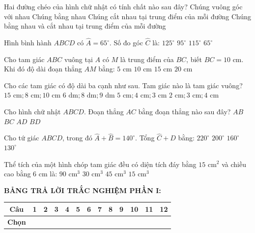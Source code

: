 \documentclass[12pt,a4paper]{article}
\begin{document}
\begin{ex}
Hai đường chéo của hình chữ nhật có tính chất nào sau đây?
\choice
{Chúng vuông góc với nhau}
{Chúng bằng nhau}
{Chúng cắt nhau tại trung điểm của mỗi đường}
{\True Chúng bằng nhau và cắt nhau tại trung điểm của mỗi đường}
\end{ex}

\begin{ex}
Hình bình hành $ABCD$ có $\widehat{A} = 65^\circ$. Số đo góc $\widehat{C}$ là:
\choice
{$125^\circ$}
{$95^\circ$}
{$115^\circ$}
{\True $65^\circ$}
\end{ex}

\begin{ex}
Cho tam giác $ABC$ vuông tại $A$ có $M$ là trung điểm của $BC$, biết $BC = 10\text{ cm}$. Khi đó độ dài đoạn thẳng $AM$ bằng:
\choice
{\True $5\text{ cm}$}
{$10\text{ cm}$}
{$15\text{ cm}$}
{$20\text{ cm}$}
\end{ex}

\begin{ex}
Cho các tam giác có độ dài ba cạnh như sau. Tam giác nào là tam giác vuông?
\choice
{$15\text{ cm}; 8\text{ cm}; 10\text{ cm}$}
{$6\text{ dm}; 8\text{ dm}; 9\text{ dm}$}
{\True $5\text{ cm}; 4\text{ cm}; 3\text{ cm}$}
{$2\text{ cm}; 3\text{ cm}; 4\text{ cm}$}
\end{ex}

\begin{ex}
Cho hình chữ nhật $ABCD$. Đoạn thẳng $AC$ bằng đoạn thẳng nào sau đây?
\choice
{$AB$}
{$BC$}
{$AD$}
{\True $BD$}
\end{ex}

\begin{ex}
Cho tứ giác $ABCD$, trong đó $\widehat{A} + \widehat{B} = 140^\circ$. Tổng $\widehat{C} + \widehat{D}$ bằng:
\choice
{\True $220^\circ$}
{$200^\circ$}
{$160^\circ$}
{$130^\circ$}
\end{ex}

\begin{ex}
Thể tích của một hình chóp tam giác đều có diện tích đáy bằng $15\text{ cm}^2$ và chiều cao bằng $6\text{ cm}$ là:
\choice
{$90\text{ cm}^3$}
{\True $30\text{ cm}^3$}
{$45\text{ cm}^3$}
{$15\text{ cm}^3$}
\end{ex}


\vspace{1mm}
\noindent\textbf{BẢNG TRẢ LỜI TRẮC NGHIỆM PHẦN I:}
\begin{center}
\begin{tabular}{|c|c|c|c|c|c|c|c|c|c|c|c|c|}
\hline
\textbf{Câu} & \textbf{1} & \textbf{2} & \textbf{3} & \textbf{4} & \textbf{5} & \textbf{6} & \textbf{7} & \textbf{8} & \textbf{9} & \textbf{10} & \textbf{11} & \textbf{12} \\
\hline
\textbf{Chọn} & \rule{0pt}{0.65cm} & & & & & & & & & & & \\
\hline
\end{tabular}
\end{center}
\vspace{2mm}
\end{document}
